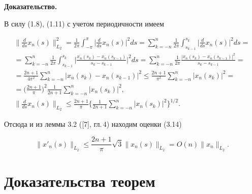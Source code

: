 {\bf Доказательство.}


В силу (1.8), (1.11) с учетом периодичности имеем


\begin{gather*}


\bigg\|\frac{d}{ds}x_{n}(s)\bigg\|_{L_2}^{2}=\frac{1}{2\pi}\int_{-\pi}^{\pi}


\bigg|\frac{d}{ds}x_{n}(s)\bigg|^2 ds=


\sum_{k=-n}^{n}\frac{1}{2\pi}\int_{s_{k-1}}^{s_k}


\bigg|\frac{d}{ds}x_{n}(s)\bigg|^2 ds= \\


%


=\sum_{k=-n}^{n}\frac{1}{2\pi} \int_{s_{k-1}}^{s_{k}}\bigg|


\frac{x_n (s_k)-x_n (s_{k-1})}{s_k - s_{k-1}} \bigg|^2 ds=


\sum_{k=-n}^{n}\frac{1}{2\pi}


\frac{|x_{n}(s_{k})-x_{n}(s_{k-1})|^2}{s_k -s_{k-1}}= \\


%


=\frac{2n+1}{4 \pi^2}\sum_{k=-n}^{n}|x_{n}(s_{k})- x_{n}(s_{k-1})|^2


\le\frac{2n+1}{\pi^2}\sum_{k=-n}^{n}|x_n(s_k)|^2=\\


%


=\bigg(\frac{2n+1}{\pi} \bigg)^2 \frac{1}{2n+1}


\sum_{k=-n}^{n}|x_n (s_k)|^2, \\


%


\bigg\|\frac{d}{ds}x_{n}(s)\bigg\|_{L_2}\le


\frac{2n+1}{\pi} \bigg\{\frac{1}{2n+


1}\sum_{k=-n}^{n}|x_n (s_k)|^2 \bigg\}^{1/2}.


\end{gather*}


Отсюда и из леммы 3.2 ([7], гл.\,4) находим оценки (3.14)


$$


\|x'_{n}(s)\|_{L_2} \le \frac{2n+1}{\pi}


\sqrt{3}\|x_{n}(s)\|_{L_2}=O(n)\|x_n\|_{L_2}.


$$





\section{Доказательства теорем}





